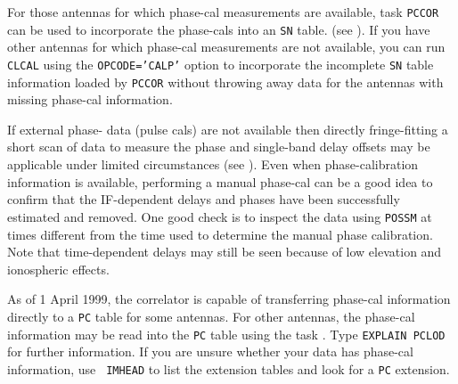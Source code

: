 For those antennas for which phase-cal measurements are available,
task {\tt PCCOR} can be used to incorporate the phase-cals into an
{\tt SN} table. (see ).  If you have other antennas for
which phase-cal measurements are not available, you can run {\tt
CLCAL} using the {\tt OPCODE='CALP'} option to incorporate the
incomplete {\tt SN} table information loaded by {\tt PCCOR} without
throwing away data for the antennas with missing phase-cal
information.

If external phase- data (pulse cals) are not
available then directly fringe-fitting a short scan of data to measure
the phase and single-band delay offsets may be applicable under
limited circumstances (see ).  Even when
phase-calibration information is available, performing a manual
phase-cal can be a good idea to confirm that the IF-dependent delays
and phases have been successfully estimated and removed.  One good
check is to inspect the data using {\tt POSSM} at times different from
the time used to determine the manual phase calibration.  Note that
time-dependent delays may still be seen because of low elevation and
ionospheric effects.

As of 1 April 1999, the  correlator is capable of
transferring phase-cal information directly to a {\tt PC} table for
some antennas. For other antennas, the phase-cal information may be
read into the {\tt PC} table using the task {\tt{}}\@. Type
{\tt EXPLAIN PCLOD} for further information.  If you are unsure
whether your  data has phase-cal information, use {\tt
IMHEAD} to list the extension tables and look for a {\tt PC}
extension.

